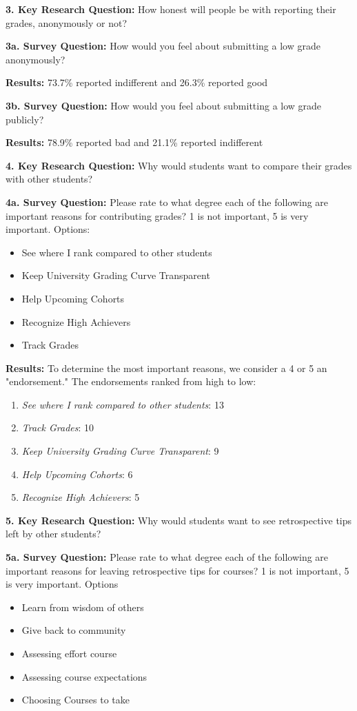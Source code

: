\textbf{3. Key Research Question:} How honest will people be with reporting their grades, anonymously or not?
\smallskip

\textbf{3a. Survey Question:} How would you feel about submitting a low grade anonymously?
\smallskip

\textbf{Results:} 73.7\% reported indifferent and 26.3\% reported good
\smallskip

\textbf{3b. Survey Question:} How would you feel about submitting a low grade publicly?
\smallskip

\textbf{Results:} 78.9\% reported bad and 21.1\% reported indifferent

\textbf{4. Key Research Question:} Why would students want to compare their grades with other students?
\smallskip

\textbf{4a. Survey Question:} Please rate to what degree each of the following are important reasons for contributing grades? 1 is not important, 5 is very important. Options:
\begin{itemize}
    \item See where I rank compared to other students
    \item Keep University Grading Curve Transparent
    \item Help Upcoming Cohorts
    \item Recognize High Achievers
    \item Track Grades
\end{itemize}

\textbf{Results:} To determine the most important reasons, we consider a 4 or 5 an "endorsement." The endorsements ranked from high to low:
\begin{enumerate}
    \item \textit{See where I rank compared to other students}: 13
    \item \textit{Track Grades}: 10
    \item \textit{Keep University Grading Curve Transparent}: 9
    \item \textit{Help Upcoming Cohorts}: 6
    \item \textit{Recognize High Achievers}: 5
\end{enumerate}
\smallskip

\textbf{5. Key Research Question:} Why would students want to see retrospective tips left by other students?
\smallskip

\textbf{5a. Survey Question:} Please rate to what degree each of the following are important reasons for leaving retrospective tips for courses? 1 is not important, 5 is very important. Options
\begin{itemize}
    \item Learn from wisdom of others
    \item Give back to community
    \item Assessing effort course
    \item Assessing course expectations
    \item Choosing Courses to take
\end{itemize}

